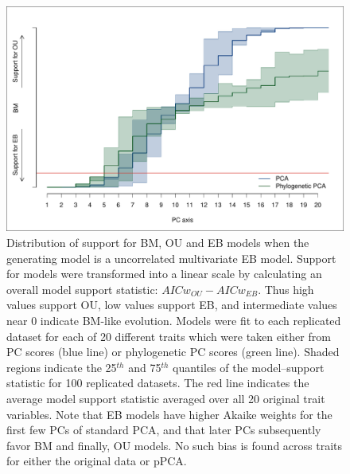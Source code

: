 \documentclass[a4paper,12pt]{article}
\begin{document}
\begin{figure}[p]
\centering
\includegraphics[scale=0.65]{./fig/uncor-eb-aic.pdf}
\caption{Distribution of support for BM, OU and EB models when the generating model is a uncorrelated multivariate EB model. Support for models were transformed into a linear scale by calculating an overall model support statistic: $AICw_{OU} - AICw_{EB}$. Thus high values support OU, low values support EB, and intermediate values near 0 indicate BM-like evolution. Models were fit to each replicated dataset for each of 20 different traits which were taken either from PC scores (blue line) or phylogenetic PC scores (green line). Shaded regions indicate the 25$^{th}$ and 75$^{th}$ quantiles of the model--support statistic for 100 replicated datasets. The red  line indicates the average model support statistic averaged over all 20 original trait variables. Note that EB models have higher Akaike weights for the first few PCs of standard PCA, and that later PCs subsequently favor BM and finally, OU models. No such bias is found across traits for either the original data or pPCA.}
\label{aicweb}
\end{figure}
\end{document}

